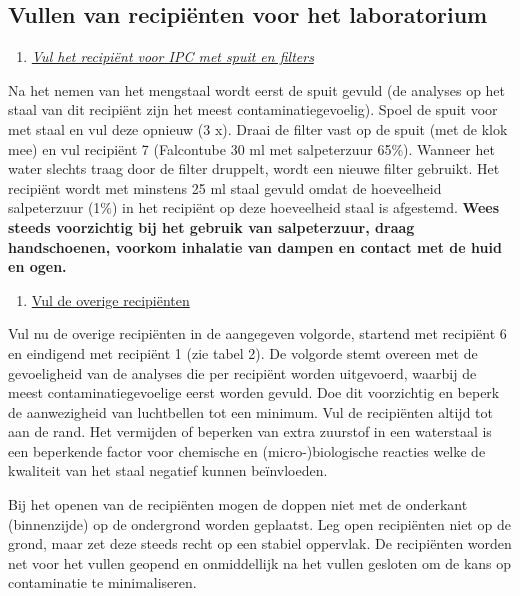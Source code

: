\documentclass[
]{scrreprt}
\providecommand{\tightlist}{%
  \setlength{\itemsep}{0pt}\setlength{\parskip}{0pt}}
\begin{document}
\subsection{\texorpdfstring{\textbf{Vullen van recipiënten voor het laboratorium}}{Vullen van recipiënten voor het laboratorium}}\label{vullen-van-recipiuxebnten-voor-het-laboratorium}

\begin{enumerate}
\def\labelenumi{\arabic{enumi}.}
\tightlist
\item
  \ul{\emph{Vul het recipiënt voor IPC met spuit en filters}}
\end{enumerate}

Na het nemen van het mengstaal wordt eerst de spuit gevuld (de analyses op het staal van dit recipiënt zijn het meest contaminatiegevoelig). Spoel de spuit voor met staal en vul deze opnieuw (3 x). Draai de filter vast op de spuit (met de klok mee) en vul recipiënt 7 (Falcontube 30 ml met salpeterzuur 65\%). Wanneer het water slechts traag door de filter druppelt, wordt een nieuwe filter gebruikt. Het recipiënt wordt met minstens 25 ml staal gevuld omdat de hoeveelheid salpeterzuur (1\%) in het recipiënt op deze hoeveelheid staal is afgestemd. \textbf{Wees steeds voorzichtig bij het gebruik van salpeterzuur, draag handschoenen, voorkom inhalatie van dampen en contact met de huid en ogen.}

\begin{enumerate}
\def\labelenumi{\arabic{enumi}.}
\setcounter{enumi}{1}
\tightlist
\item
  \ul{Vul de overige recipiënten}
\end{enumerate}

Vul nu de overige recipiënten in de aangegeven volgorde, startend met recipiënt 6 en eindigend met recipiënt 1 (zie tabel 2). De volgorde stemt overeen met de gevoeligheid van de analyses die per recipiënt worden uitgevoerd, waarbij de meest contaminatiegevoelige eerst worden gevuld. Doe dit voorzichtig en beperk de aanwezigheid van luchtbellen tot een minimum. Vul de recipiënten altijd tot aan de rand. Het vermijden of beperken van extra zuurstof in een waterstaal is een beperkende factor voor chemische en (micro-)biologische reacties welke de kwaliteit van het staal negatief kunnen beïnvloeden.

Bij het openen van de recipiënten mogen de doppen niet met de onderkant (binnenzijde) op de ondergrond worden geplaatst. Leg open recipiënten niet op de grond, maar zet deze steeds recht op een stabiel oppervlak. De recipiënten worden net voor het vullen geopend en onmiddellijk na het vullen gesloten om de kans op contaminatie te minimaliseren.
\end{document}
